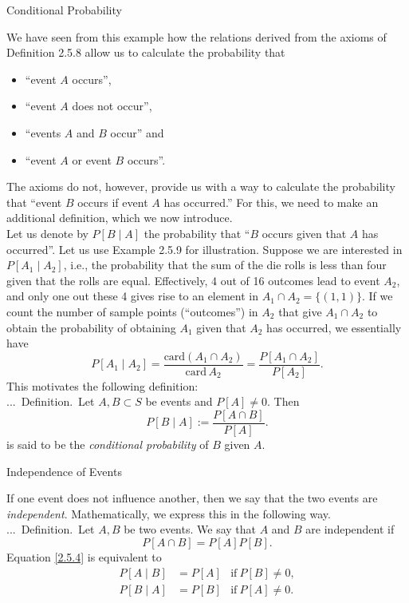 \documentclass[smaller,hyperref={CJKbookmarks=true}]{beamer}
\newcounter{zhuo}[subsection]
\renewcommand{\thezhuo}{\thesection.\thesubsection.\arabic{zhuo}}
\newenvironment{DEFINITION}{\stepcounter{zhuo}\alert{\thezhuo.~Definition.\,}}{}
\begin{document}
\begin{frame}{Conditional Probability}
\begin{spacing}{1.1}
\vspace*{-6pt}
We have seen from this example how the relations derived from the axioms
of Definition 2.5.8 allow us to calculate the probability that
\begin{itemize}
  \item ``event $A$ occurs'',
  \item ``event $A$ does not occur'',
  \item ``events $A$ and $B$ occur'' and
  \item ``event $A$ or event $B$ occurs''.
\end{itemize}
The axioms do not, however, provide us with a way to calculate the
probability that ``event $B$ occurs if event $A$ has occurred.'' For this, we
need to make an additional definition, which we now introduce.\\[5pt]
Let us denote by $P[B\mid A]$ the probability that ``$B$ occurs given that $A$ has occurred''. Let us use Example 2.5.9 for illustration. Suppose we are interested in $P[A_1\mid A_2]$, i.e., the probability that the sum of the die rolls is
less than four given that the rolls are equal. Effectively, 4 out of 16
outcomes lead to event $A_2$, and only one out these 4 gives rise to an element in $A_1\cap A_2=\{(1,1)\}$.
\newpage
If we count the number of sample points (``outcomes'') in $A_2$ that give $A_1\cap A_2$ to obtain the probability of obtaining $A_1$ given that $A_2$ has occurred, we essentially have
\[P[A_1\mid A_2]=\frac{\text{card}(A_1\cap A_2)}{\text{card}\,A_2}=\frac{P[A_1\cap A_2]}{P[A_2]}.\]
This motivates the following definition:\\[5pt]
\begin{DEFINITION}
Let $A,B\subset S$ be events and $P[A]\neq 0$. Then
\[P[B\mid A]:=\frac{P[A\cap B]}{P[A]}.\]
is said to be the \emph{conditional probability} of $B$ given $A$.
\end{DEFINITION}
\end{spacing}
\end{frame}
\begin{frame}[c]{Independence of Events}
\begin{spacing}{1.1}
If one event does not influence another, then we say that the two events
are \emph{independent}. Mathematically, we express this in the following way.\\[6pt]
\begin{DEFINITION}
Let $A,B$ be two events. We say that $A$ and $B$ are independent if
\begin{equation}\label{2.5.4}
P[A\cap B]=P[A]P[B].
\end{equation}
Equation \eqref{2.5.4} is equivalent to
\begin{align*}
  P[A\mid B] &=P[A] & \text{if}~P[B]\neq0,\\
  P[B\mid A] &=P[B] & \text{if}~P[A]\neq 0.
\end{align*}
\end{DEFINITION}
\end{spacing}
\end{frame}
\end{document}
